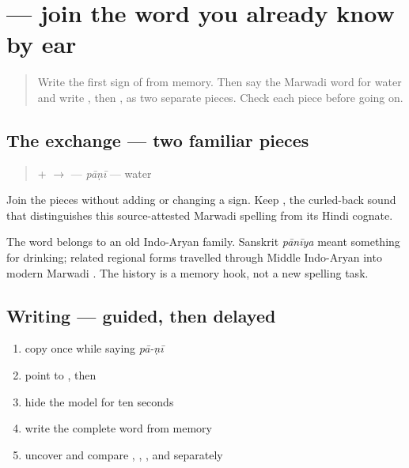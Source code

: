 \section[\texorpdfstring{\mw{पाणी} (pāṇī)}{पाणी (pāṇī)}]{ — join the word you already know by ear}

\label{lesson:MW-C04-paani}



\begin{quote}
Write the first sign of \textbf{} from memory. Then say the Marwadi word for water and write \textbf{}, then \textbf{}, as two separate pieces. Check each piece before going on.
\end{quote}

\subsection*{The exchange — two familiar pieces}
\begin{quote}
\textbf{} + \textbf{} $\to$ \textbf{} — \emph{pāṇī} — water
\end{quote}

Join the pieces without adding or changing a sign. Keep \textbf{}, the curled-back sound that distinguishes this source-attested Marwadi spelling from its Hindi cognate.

\begin{cousinweb}
The word belongs to an old Indo-Aryan family. Sanskrit \emph{pānīya} meant something for drinking; related regional forms travelled through Middle Indo-Aryan into modern Marwadi \textbf{}. The history is a memory hook, not a new spelling task.
\end{cousinweb}

\subsection*{Writing — guided, then delayed}
\begin{enumerate}
\raggedright
  \item copy \textbf{} once while saying \emph{pā-ṇī}
  \item point to \textbf{}, then \textbf{}
  \item hide the model for ten seconds
  \item write the complete word from memory
  \item uncover and compare \textbf{}, \textbf{}, \textbf{}, and \textbf{} separately
\end{enumerate}

